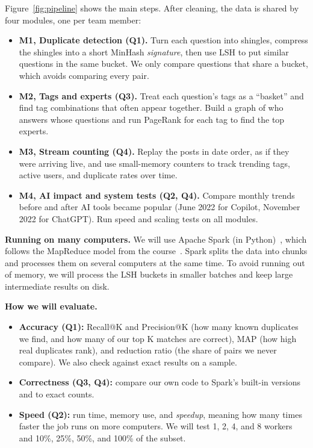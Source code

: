 \documentclass[11pt,a4paper]{article}
\begin{document}
Figure~\ref{fig:pipeline} shows the main steps. After cleaning, the data is
shared by four modules, one per team member:
\begin{itemize}
  \item \textbf{M1, Duplicate detection (Q1).} Turn each question into
        shingles, compress the shingles into a short MinHash
        \emph{signature}, then use LSH to put similar questions in the same
        bucket. We only compare questions that share a bucket, which avoids
        comparing every pair.
  \item \textbf{M2, Tags and experts (Q3).} Treat each question's tags as a
        ``basket'' and find tag combinations that often appear together. Build
        a graph of who answers whose questions and run PageRank for each tag to
        find the top experts.
  \item \textbf{M3, Stream counting (Q4).} Replay the posts in date order, as if
        they were arriving live, and use small-memory counters to track trending
        tags, active users, and duplicate rates over time.
  \item \textbf{M4, AI impact and system tests (Q2, Q4).} Compare monthly
        trends before and after AI tools became popular (June 2022 for Copilot,
        November 2022 for ChatGPT). Run speed and scaling tests on all modules.
\end{itemize}

\textbf{Running on many computers.} We will use Apache Spark (in
Python)~\cite{zaharia2012}, which follows the MapReduce model from the
course~\cite{dean2004}. Spark splits the data into chunks and processes them on
several computers at the same time. To avoid running out of memory, we will
process the LSH buckets in smaller batches and keep large intermediate results
on disk.

\textbf{How we will evaluate.}
\begin{itemize}
  \item \textbf{Accuracy (Q1):} Recall@K and Precision@K (how many known
        duplicates we find, and how many of our top K matches are correct), MAP
        (how high real duplicates rank), and reduction ratio (the share of pairs
        we never compare). We also check against exact results on a sample.
  \item \textbf{Correctness (Q3, Q4):} compare our own code to Spark's built-in
        versions and to exact counts.
  \item \textbf{Speed (Q2):} run time, memory use, and \emph{speedup}, meaning
        how many times faster the job runs on more computers. We will test
        1, 2, 4, and 8 workers and 10\%, 25\%, 50\%, and 100\% of the subset.
\end{itemize}
\end{document}
